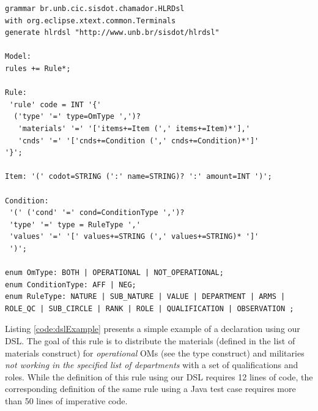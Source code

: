 \begin{lstlisting}[frame=single, language=Xtext, caption={\it Xtext grammar defining the DSL structure}, label={code:gramatica}]
grammar br.unb.cic.sisdot.chamador.HLRDsl 
with org.eclipse.xtext.common.Terminals
generate hlrdsl "http://www.unb.br/sisdot/hlrdsl"

Model:
rules += Rule*;

Rule:
 'rule' code = INT '{'
  ('type' '=' type=OmType ',')?
   'materials' '=' '['items+=Item (',' items+=Item)*'],'
   'cnds' '=' '['cnds+=Condition (',' cnds+=Condition)*']'
'}';

Item: '(' codot=STRING (':' name=STRING)? ':' amount=INT ')';

Condition:
 '(' ('cond' '=' cond=ConditionType ',')?
 'type' '=' type = RuleType ','
 'values' '=' '[' values+=STRING (',' values+=STRING)* ']'
 ')';

enum OmType: BOTH | OPERATIONAL | NOT_OPERATIONAL;
enum ConditionType: AFF | NEG;
enum RuleType: NATURE | SUB_NATURE | VALUE | DEPARTMENT | ARMS | ROLE_QC | SUB_CIRCLE | RANK | ROLE | QUALIFICATION | OBSERVATION ;
\end{lstlisting}

Listing \ref{code:dslExample} presents a simple example of a \shc declaration using our DSL. 
The goal of this rule is to distribute 
the materials (defined in the list of materials construct) for \emph{operational} OMs (see the 
type construct) and militaries \emph{not working in the specified list of 
departments} with a set of qualifications and roles. While the definition of this rule 
using our DSL requires 12 lines of code, the corresponding definition of the same rule 
using a Java test case requires more than 50 lines of imperative code.



